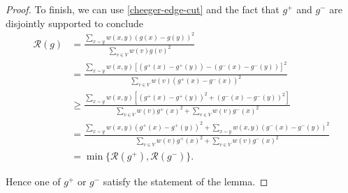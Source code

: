 \documentclass[a4paper,11pt]{article}
\theoremstyle{definition}
\newcommand{\rayleigh}[1]{\mathcal{R}\left(#1\right)}
\newcommand{\rayleighfull}[1]{\frac{\sum_{x \sim y} w(x, y)\left(#1(x) - #1(y)\right)^2}{\sum_{v \in V} w(v)#1(v)^2}}
\begin{document}
\begin{proof}
To finish, we can use \eqref{cheeger-edge-cut} and the fact that $g^+$ and $g^-$ are disjointly supported to conclude
\begin{align*}
\rayleigh{g}
&= \rayleighfull{g} \\
&= \frac{\sum_{x \sim y} w(x, y)\left[(g^+(x) - g^+(y)) - (g^-(x) - g^-(y))\right]^2}{\sum_{v \in V} w(v)(g^+(x) - g^-(x))^2} \\
&\ge \frac{\sum_{x \sim y} w(x, y)\left[(g^+(x) - g^+(y))^2 + (g^-(x) - g^-(y))^2\right]}{\sum_{v \in V} w(v)g^+(x)^2 + \sum_{v \in V} w(v)g^-(x)^2} \\
&= \frac{\sum_{x \sim y} w(x, y)(g^+(x) - g^+(y))^2 + \sum_{x \sim y} w(x, y)(g^-(x) - g^-(y))^2}{\sum_{v \in V} w(v)g^+(x)^2 + \sum_{v \in V} w(v)g^-(x)^2} \\
&= \min \{ \rayleigh{g^+}, \rayleigh{g^-} \}.
\end{align*}

Hence one of $g^+$ or $g^-$ satisfy the statement of the lemma.
\end{proof}
\end{document}
